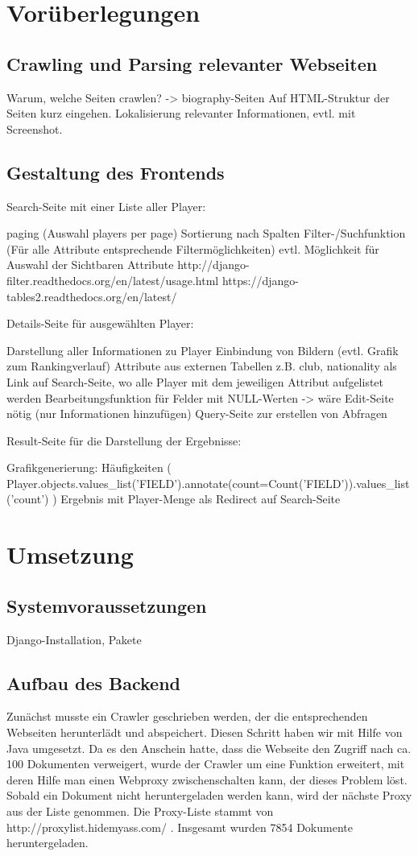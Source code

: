 \documentclass[12pt,a4paper]{scrreprt}
\begin{document}
\chapter{Vorüberlegungen}
\section{Crawling und Parsing relevanter Webseiten}
Warum, welche Seiten crawlen? -> biography-Seiten
Auf HTML-Struktur der Seiten kurz eingehen.
Lokalisierung relevanter Informationen, evtl. mit Screenshot.

\section{Gestaltung des Frontends}
Search-Seite mit einer Liste aller Player:

paging (Auswahl players per page)
Sortierung nach Spalten
Filter-/Suchfunktion (Für alle Attribute entsprechende Filtermöglichkeiten)
evtl. Möglichkeit für Auswahl der Sichtbaren Attribute
http://django-filter.readthedocs.org/en/latest/usage.html https://django-tables2.readthedocs.org/en/latest/

Details-Seite für ausgewählten Player:

Darstellung aller Informationen zu Player
Einbindung von Bildern
(evtl. Grafik zum Rankingverlauf)
Attribute aus externen Tabellen z.B. club, nationality als Link auf Search-Seite, wo alle Player mit dem jeweiligen Attribut aufgelistet werden
Bearbeitungsfunktion für Felder mit NULL-Werten -> wäre Edit-Seite nötig (nur Informationen hinzufügen)
Query-Seite zur erstellen von Abfragen

Result-Seite für die Darstellung der Ergebnisse:

Grafikgenerierung: Häufigkeiten ( Player.objects.values\_list('FIELD').annotate(count=Count('FIELD')).values\_list('count') )
Ergebnis mit Player-Menge als Redirect auf Search-Seite

\chapter{Umsetzung}
\section{Systemvoraussetzungen}
Django-Installation, Pakete

\section{Aufbau des Backend}
\label{Backend}
Zunächst musste ein Crawler geschrieben werden, der die entsprechenden Webseiten herunterlädt und abspeichert. Diesen Schritt haben wir mit Hilfe von Java umgesetzt. Da es den Anschein hatte, dass die Webseite den Zugriff nach ca. 100 Dokumenten verweigert, wurde der Crawler um eine Funktion erweitert, mit deren Hilfe man einen Webproxy zwischenschalten kann, der dieses Problem löst. Sobald ein Dokument nicht heruntergeladen werden kann, wird der nächste Proxy aus der Liste genommen. Die Proxy-Liste stammt von http://proxylist.hidemyass.com/ \cite{HMA2015}. Insgesamt wurden 7854 Dokumente heruntergeladen.\\
\end{document}
